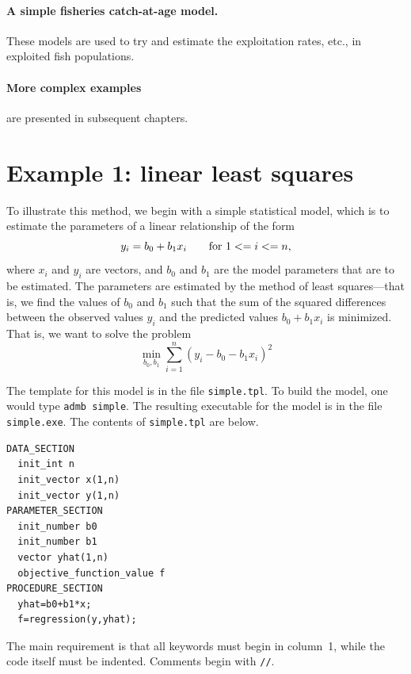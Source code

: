 \documentclass{admbmanual}
\begin{document}
\paragraph{A simple fisheries catch-at-age model.} These models are used to try
and estimate the exploitation rates, etc., in exploited fish populations.

\paragraph{More complex examples} are presented in subsequent chapters.

\section{Example 1: linear least squares}

To illustrate this method, we begin with a simple statistical model, which is to
estimate the parameters of a linear relationship of the form
$$y_i=b_0+b_1x_i\qquad \hbox{\rm for}\ 1<=i<=n,$$
where $x_i$ and $y_i$ are vectors, and $b_0$ and $b_1$ are the model parameters
that are to be estimated. The parameters are estimated by the method
of least squares---that is, we find the values of $b_0$ and $b_1$ such that
the sum of the squared differences between the observed values
$y_i$ and the predicted values $b_0+b_1x_i$ is minimized. That is,
we want to solve the problem
$$\min_{b_0,b_1}\sum_{i=1}^n(y_i-b_0-b_1x_i)^2$$

The template for this model is in the file \texttt{simple.tpl}. To build the
model, one would type \texttt{admb simple}. The resulting executable for the
model is in the file \texttt{simple.exe}. The contents of \texttt{simple.tpl}
are below.
\begin{lstlisting}
DATA_SECTION
  init_int n
  init_vector x(1,n)
  init_vector y(1,n)
PARAMETER_SECTION
  init_number b0
  init_number b1
  vector yhat(1,n)
  objective_function_value f
PROCEDURE_SECTION
  yhat=b0+b1*x;
  f=regression(y,yhat);
\end{lstlisting}
The main requirement is that all keywords must begin in column~1, while the code
itself must be indented. Comments begin with \texttt{//}.
\end{document}
